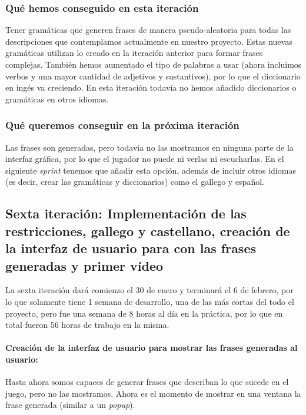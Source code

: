 \subsubsection{Qué hemos conseguido en esta iteración}

Tener gramáticas que generen frases de manera pseudo-aleatoria para todas las descripciones que contemplamos actualmente en nuestro proyecto. Estas nuevas gramáticas utilizan lo creado en la iteración anterior para formar frases complejas. También hemos aumentado el tipo de palabras a usar (ahora incluimos verbos y una mayor cantidad de adjetivos y sustantivos), por lo que el diccionario en ingés va creciendo. En esta iteración todavía no hemos añadido diccionarios o gramáticas en otros idiomas.

\subsubsection{Qué queremos conseguir en la próxima iteración}

Las frases son generadas, pero todavía no las mostramos en ninguna parte de la interfaz gráfica, por lo que el jugador no puede ni verlas ni escucharlas. En el siguiente \textit{sprint} tenemos que añadir esta opción, además de incluir otros idiomas (es decir, crear las gramáticas y diccionarios) como el gallego y español.

\subsection{Sexta iteración: Implementación de las restricciones, gallego y castellano, creación de la interfaz de usuario para con las frases generadas y primer vídeo}

La sexta iteración dará comienzo el 30 de enero y terminará el 6 de febrero, por lo que solamente tiene 1 semana de desarrollo, una de las más cortas del todo el proyecto, pero fue una semana de 8 horas al día en la práctica, por lo que en total fueron 56 horas de trabajo en la misma.

\paragraph{Creación de la interfaz de usuario para mostrar las frases generadas al usuario:} Hasta ahora somos capaces de generar frases que describan lo que sucede en el juego, pero no las mostramos. Ahora es el momento de mostrar en una ventana la frase generada (similar a un \textit{popup}).

